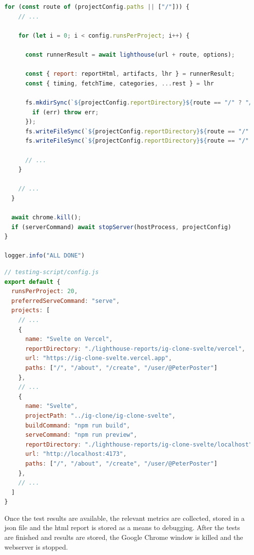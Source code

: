 \documentclass[a4paper, 10pt]{article}
\begin{document}
\begin{lstlisting}[caption={Automation script for Lighthouse tests}, language=JavaScript, label={lst:lighthouse-script}]
  for (const route of (projectConfig.paths || ["/"])) {
    // ...

    for (let i = 0; i < config.runsPerProject; i++) {

      const runnerResult = await lighthouse(url + route, options);

      const { report: reportHtml, artifacts, lhr } = runnerResult;
      const { timing, fetchTime, categories, ...rest } = lhr

      fs.mkdirSync(`${projectConfig.reportDirectory}${route == "/" ? "/index" : route}`, { recursive: true }, (err) => {
        if (err) throw err;
      });
      fs.writeFileSync(`${projectConfig.reportDirectory}${route == "/" ? "/index" : route}/lighthouse-report-${new URL(url).hostname}-${dateToUriSafeString(new Date())}.html`, reportHtml);
      fs.writeFileSync(`${projectConfig.reportDirectory}${route == "/" ? "/index" : route}/lighthouse-report-${new URL(url).hostname}-${dateToUriSafeString(new Date())}.json`, JSON.stringify({ artifacts, lhr }, null, 2));

      // ...
    }

    // ...
  }

  await chrome.kill();
  if (serverCommand) await stopServer(hostProcess, projectConfig)
}

logger.info("ALL DONE")
\end{lstlisting}

\begin{lstlisting}[caption={Test configuration for Lighthouse tests}, language=JavaScript, label={lst:lighthouse-config}]
// testing-script/config.js
export default {
  runsPerProject: 20,
  preferredServeCommand: "serve",
  projects: [
    // ...
    {
      name: "Svelte on Vercel",
      reportDirectory: "./lighthouse-reports/ig-clone-svelte/vercel",
      url: "https://ig-clone-svelte.vercel.app",
      paths: ["/", "/about", "/create", "/user/@PeterPoster"]
    },
    // ...
    {
      name: "Svelte",
      projectPath: "../ig-clone/ig-clone-svelte",
      buildCommand: "npm run build",
      serveCommand: "npm run preview",
      reportDirectory: "./lighthouse-reports/ig-clone-svelte/localhost",
      url: "http://localhost:4173",
      paths: ["/", "/about", "/create", "/user/@PeterPoster"]
    },
    // ...
  ]
}
\end{lstlisting}

Once the test results are available, the relevant metrics are collected, stored in a \acrshort{json} file and the \acrshort{html} report is stored as a means to debugging.
After the tests are finished and results are stored, the Google Chrome window is killed and the webserver is stopped.
\end{document}
